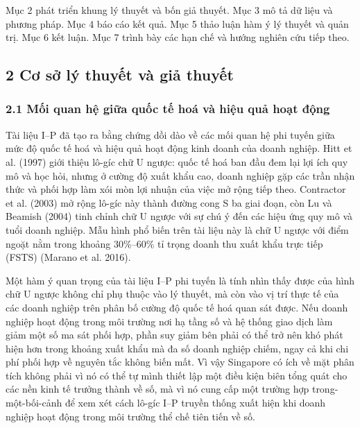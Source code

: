 \documentclass[12pt,a4paper]{article}
\begin{document}
Mục 2 phát triển khung lý thuyết và bốn giả thuyết. Mục 3 mô tả dữ liệu
và phương pháp. Mục 4 báo cáo kết quả. Mục 5 thảo luận hàm ý lý thuyết
và quản trị. Mục 6 kết luận. Mục 7 trình bày các hạn chế và hướng nghiên
cứu tiếp theo.

\hypertarget{2-cux1a1-sux1edf-luxfd-thuyux1ebft-vuxe0-giux1ea3-thuyux1ebft}{%
\subsection{2 Cơ sở lý thuyết và giả
thuyết}\label{2-cux1a1-sux1edf-luxfd-thuyux1ebft-vuxe0-giux1ea3-thuyux1ebft}}

\hypertarget{21-mux1ed1i-quan-hux1ec7-giux1eefa-quux1ed1c-tux1ebf-houxe1-vuxe0-hiux1ec7u-quux1ea3-houx1ea1t-ux111ux1ed9ng}{%
\subsubsection{2.1 Mối quan hệ giữa quốc tế hoá và hiệu quả hoạt
động}\label{21-mux1ed1i-quan-hux1ec7-giux1eefa-quux1ed1c-tux1ebf-houxe1-vuxe0-hiux1ec7u-quux1ea3-houx1ea1t-ux111ux1ed9ng}}

Tài liệu I--P đã tạo ra bằng chứng dồi dào về các mối quan hệ phi tuyến
giữa mức độ quốc tế hoá và hiệu quả hoạt động kinh doanh của doanh
nghiệp. Hitt et al. (1997) giới thiệu lô-gíc chữ U ngược: quốc tế hoá
ban đầu đem lại lợi ích quy mô và học hỏi, nhưng ở cường độ xuất khẩu
cao, doanh nghiệp gặp các trần nhận thức và phối hợp làm xói mòn lợi
nhuận của việc mở rộng tiếp theo. Contractor et al. (2003) mở rộng
lô-gíc này thành đường cong S ba giai đoạn, còn Lu và Beamish (2004)
tinh chỉnh chữ U ngược với sự chú ý đến các hiệu ứng quy mô và tuổi
doanh nghiệp. Mẫu hình phổ biến trên tài liệu này là chữ U ngược với
điểm ngoặt nằm trong khoảng 30\%--60\% tỉ trọng doanh thu xuất khẩu trực
tiếp (FSTS) (Marano et al. 2016).

Một hàm ý quan trọng của tài liệu I--P phi tuyến là tính nhìn thấy được
của hình chữ U ngược không chỉ phụ thuộc vào lý thuyết, mà còn vào vị
trí thực tế của các doanh nghiệp trên phân bố cường độ quốc tế hoá quan
sát được. Nếu doanh nghiệp hoạt động trong môi trường nơi hạ tầng số và
hệ thống giao dịch làm giảm một số ma sát phối hợp, phần suy giảm bên
phải có thể trở nên khó phát hiện hơn trong khoảng xuất khẩu mà đa số
doanh nghiệp chiếm, ngay cả khi chi phí phối hợp về nguyên tắc không
biến mất. Vì vậy Singapore có ích về mặt phân tích không phải vì nó có
thể tự mình thiết lập một điều kiện biên tổng quát cho các nền kinh tế
trưởng thành về số, mà vì nó cung cấp một trường hợp trong-một-bối-cảnh
để xem xét cách lô-gíc I--P truyền thống xuất hiện khi doanh nghiệp hoạt
động trong môi trường thể chế tiên tiến về số.
\end{document}
